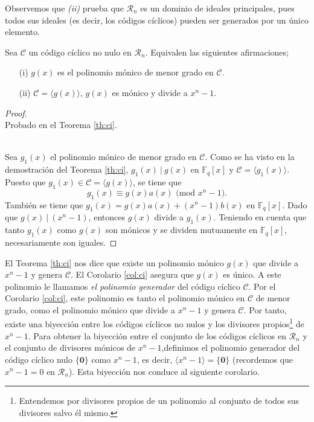 Observemos que \textit{(ii)} prueba que $\mathcal{R}_n$ es un dominio de ideales principales, pues todos sus ideales (es decir, los códigos cíclicos) pueden ser generados por un único elemento. 

\begin{corolario}\label{col:ci}
Sea $\mathcal{C}$ un código cíclico no nulo en $\mathcal{R}_n$. Equivalen las siguientes afirmaciones;
\begin{itemize}
    \item[(i)] $g(x)$ es el polinomio mónico de menor grado en $\mathcal{C}$.
    \item[(ii)]  $\mathcal{C} = \langle g(x) \rangle$, $g(x)$ es mónico y divide a $x^n - 1$.
\end{itemize}
\end{corolario}

\begin{proof}
\phantom{} \\
 Probado en el Teorema \ref{th:ci}.


 \\

Sea $g_1(x)$ el polinomio mónico de menor grado en $\mathcal{C}$. Como se ha visto en la demostración del Teorema \ref{th:ci}, $g_1(x) \ | \ g(x)$ en $\mathbb{F}_q[x]$ y $\mathcal{C}= \langle g_1(x) \rangle $. Puesto que $g_1(x) \in \mathcal{C} = \langle g(x) \rangle$, se tiene que
$$ g_1(x) \equiv g(x)a(x) \text{   (mod  } x^n - 1).$$ 
También se tiene que $g_1(x) = g(x)a(x) + (x^n - 1)b(x)$ en $\mathbb{F}_q[x]$. Dado que $g(x) \ | \ (x^n - 1)$, entonces $g(x)$ divide a $g_1(x)$. Teniendo en cuenta que tanto $g_1(x)$ como $g(x)$ son mónicos y se dividen mutuamente en $\mathbb{F}_q[x]$, necesariamente son iguales.

\end{proof}

El Teorema \ref{th:ci} nos dice que existe un polinomio mónico $g(x)$ que divide a $x^n - 1$ y genera $\mathcal{C}$. El Corolario \ref{col:ci} asegura que $g(x)$ es único. A este polinomio le llamamos \emph{el polinomio generador} del código cíclico $\mathcal{C}$. Por el Corolario \ref{col:ci}, este polinomio es tanto el polinomio mónico en $\mathcal{C}$ de menor grado, como el polinomio mónico que divide a $x^n - 1$ y genera $\mathcal{C}$. Por tanto, existe una biyección entre los códigos cíclicos no nulos y los divisores propios\footnote{Entendemos por divisores propios de un polinomio al conjunto de todos sus divisores salvo él mismo.} de $x^n-1$. Para obtener la biyección entre el conjunto de los códigos cíclicos en $\mathcal{R}_n$ y el conjunto de divisores mónicos de $x^n - 1$,definimos el polinomio generador del código cíclico nulo $\{\mathbf{0}\}$ como $x^n - 1$, es decir, $\langle x^n - 1 \rangle = \{\mathbf{0}\}$ (recordemos que $x^n - 1 = 0$ en $\mathcal{R}_n$). Esta biyección nos conduce al siguiente corolario.

